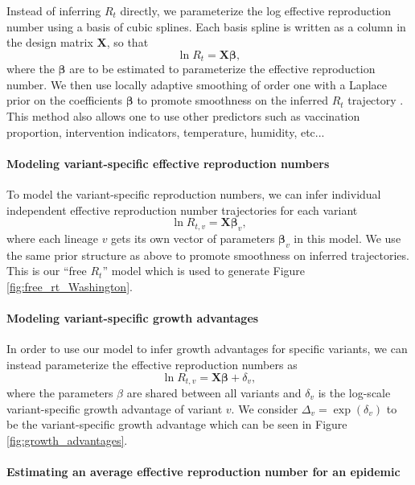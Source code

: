 \documentclass[11pt,oneside,letterpaper]{article}
\renewcommand{\vec}[1]{\boldsymbol{#1}}
\begin{document}
Instead of inferring $R_{t}$ directly, we parameterize the log effective reproduction number using a basis of cubic splines.
Each basis spline is written as a column in the design matrix $\vec{X}$, so that
\begin{equation}
  \ln R_{t} = \vec{X} \vec{\beta},
\end{equation}
where the $\vec{\beta}$ are to be estimated to parameterize the effective reproduction number.
We then use locally adaptive smoothing of order one with a Laplace prior on the coefficients $\vec{\beta}$ to promote smoothness on the inferred $R_t$ trajectory \cite{Faulkner2018}.
This method also allows one to use other predictors such as vaccination proportion, intervention indicators, temperature, humidity, etc...

\paragraph{Modeling variant-specific effective reproduction numbers}%

To model the variant-specific reproduction numbers, we can infer individual independent effective reproduction number trajectories for each variant
\begin{equation}
  \ln R_{t, v} = \vec{X} \vec{\beta}_{v},
\end{equation}
where each lineage $v$ gets its own vector of parameters $\vec{\beta}_{v}$ in this model.
We use the same prior structure as above to promote smoothness on inferred trajectories. This is our ``free $R_{t}$'' model which is used to generate Figure \ref{fig:free_rt_Washington}.

\paragraph{Modeling variant-specific growth advantages}%

In order to use our model to infer growth advantages for specific variants, we can instead parameterize the effective reproduction numbers as
\begin{equation}
\ln R_{t,v} = \vec{X} \vec{\beta} + \delta_{v},
\end{equation}
where the parameters $\beta$ are shared between all variants and $\delta_{v}$ is the log-scale variant-specific growth advantage of variant $v$.
We consider $\Delta_{v} = \exp(\delta_{v})$ to be the variant-specific growth advantage which can be seen in Figure \ref{fig:growth_advantages}.

\paragraph{Estimating an average effective reproduction number for an epidemic}
\end{document}
